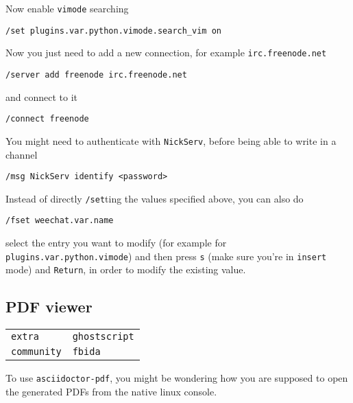 \documentclass[9pt]{report}
\newenvironment{NOTE}
{\begin{tcolorbox}[colback=admonitionBG,coltitle=draculaFG,colframe=draculaBlue,colbacktitle=draculaBlue,title=NOTE]}
{\end{tcolorbox}}
\newenvironment{packagetable}
{\begin{longtabu}to \textwidth [b]{X[1,r]|X[1,l]}}
{\end{longtabu}}
\begin{document}
Now enable \texttt{vimode} searching


\begin{verbatim}
/set plugins.var.python.vimode.search_vim on
\end{verbatim}

Now you just need to add a new connection, for example \texttt{irc.freenode.net}


\begin{verbatim}
/server add freenode irc.freenode.net
\end{verbatim}

and connect to it


\begin{verbatim}
/connect freenode
\end{verbatim}

\begin{NOTE}
    You might need to authenticate with \texttt{NickServ}, before being able to write in a channel


    \begin{verbatim}
/msg NickServ identify <password>
    \end{verbatim}
\end{NOTE}
\begin{NOTE}
    Instead of directly \texttt{/set}ting the values specified above, you can also do


    \begin{verbatim}
/fset weechat.var.name
    \end{verbatim}

    select the entry you want to modify (for example for \texttt{plugins.var.python.vimode}) and then press \texttt{s} (make sure you’re in \texttt{insert} mode) and \texttt{Return}, in order to modify the existing value.

\end{NOTE}

\newpage

\hypertarget{x-pdf-viewer}{\subsection{PDF viewer}}
\begin{packagetable}
    \texttt{extra} & \texttt{ghostscript} \\ 
    \texttt{community} & \texttt{fbida} \\ 
\end{packagetable}

To use \texttt{asciidoctor-pdf}, you might be wondering how you are supposed to open the generated PDFs from the native linux console.
\end{document}
